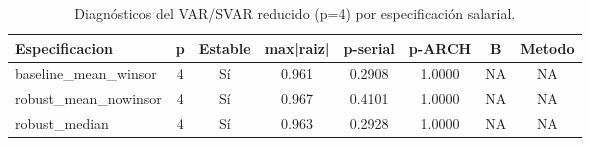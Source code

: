 \begin{table}[htbp]
\centering
\caption{Diagnósticos del VAR/SVAR reducido (p=4) por especificación salarial.}
\label{tab:vardiagnostics_p4}
\footnotesize
\begin{tabular}{lccccccc}
\toprule
Especificacion & p & Estable & max|raiz| & p-serial & p-ARCH & B & Metodo \\
\midrule
baseline_mean_winsor & 4 & Sí & 0.961 & 0.2908 & 1.0000 & NA & NA \\
robust_mean_nowinsor & 4 & Sí & 0.967 & 0.4101 & 1.0000 & NA & NA \\
robust_median & 4 & Sí & 0.963 & 0.2928 & 1.0000 & NA & NA \\
\bottomrule
\end{tabular}
\end{table}

